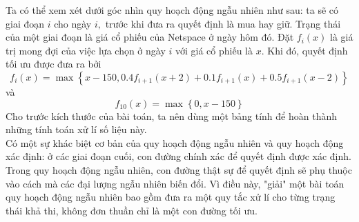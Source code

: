 \documentclass[12pt,a4paper]{article}
\begin{document}
Ta có thể xem xét dưới góc nhìn quy hoạch động ngẫu nhiên như sau: ta sẽ có giai đoạn \(i\) cho ngày \(i,\) trước khi đưa ra quyết định là mua hay giữ. Trạng thái của một giai đoạn là giá cổ phiếu của Netspace ở ngày hôm đó. Đặt \(f_i \left( x \right)\) là giá trị mong đợi của việc lựa chọn ở ngày \(i\) với giá cổ phiếu là \(x.\) Khi đó, quyết định tối ưu được đưa ra bởi
\[{f_i}\left( x \right) = \max \left\{ {x - 150,0.4{f_{i + 1}}\left( {x + 2} \right) + 0.1{f_{i + 1}}\left( x \right) + 0.5{f_{i + 1}}\left( {x - 2} \right)} \right\}\]
và
\[{f_{10}}\left( x \right) = \max \left\{ {0,x - 150} \right\}\]
Cho trước kích thước của bài toán, ta nên dùng một bảng tính để hoàn thành những tính toán xử lí số liệu này.\\
Có một sự khác biệt cơ bản của quy hoạch động ngẫu nhiên và quy hoạch động xác định: ở các giai đoạn cuối, con đường chính xác để quyết định được xác định. Trong quy hoạch động ngẫu nhiên, con đường thật sự để quyết định sẽ phụ thuộc vào cách mà các đại lượng ngẫu nhiên biến đổi. Vì điều này, "giải" một bài toán quy hoạch động ngẫu nhiên bao gồm đưa ra một quy tắc xử lí cho từng trạng thái khả thi, không đơn thuần chỉ là một con đường tối ưu.
\end{document}
